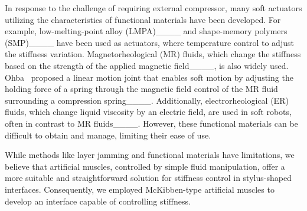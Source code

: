In response to the challenge of requiring external compressor, many soft actuators utilizing the characteristics of functional materials have been developed. 
For example, low-melting-point alloy (LMPA)____ and shape-memory polymers (SMP)____ have been used as actuators, where temperature control to adjust the stiffness variation.
Magnetorheological (MR) fluids, which change the stiffness based on the strength of the applied magnetic field____, is also widely used.  
Ohba \etal\ proposed a linear motion joint that enables soft motion by adjusting the holding force of a spring through the magnetic field control of the MR fluid surrounding a compression spring____.
Additionally, electrorheological (ER) fluids, which change liquid viscosity by an electric field, are used in soft robots, often in contrast to MR fluids____. 
However, these functional materials can be difficult to obtain and manage, limiting their ease of use.


While methods like layer jamming and functional materials have limitations, we believe that artificial muscles, controlled by simple fluid manipulation, offer a more suitable and straightforward solution for stiffness control in stylus-shaped interfaces.
Consequently, we employed McKibben-type artificial muscles to develop an interface capable of controlling stiffness.
